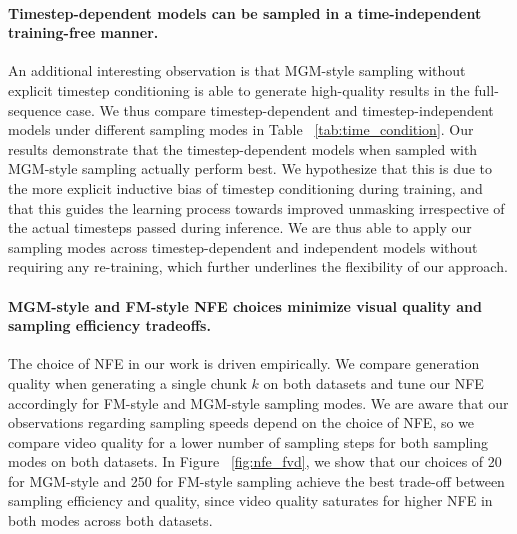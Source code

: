 \paragraph{Timestep-dependent models can be sampled in a time-independent training-free manner.}
An additional interesting observation is that MGM-style sampling without explicit timestep conditioning is able to generate high-quality results in the full-sequence case. We thus compare timestep-dependent and timestep-independent models under different sampling modes in Table ~\ref{tab:time_condition}. Our results demonstrate that the timestep-dependent models when sampled with MGM-style sampling actually perform best. We hypothesize that this is due to the more explicit inductive bias of timestep conditioning during training, and that this guides the learning process towards improved unmasking irrespective of the actual timesteps passed during inference. We are thus able to apply our sampling modes across timestep-dependent and independent models without requiring any re-training, which further underlines the flexibility of our approach.
\vspace{-10pt}

\paragraph{MGM-style and FM-style NFE choices minimize visual quality and sampling efficiency tradeoffs.}
The choice of NFE in our work is driven empirically. We compare generation quality when generating a single chunk $k$ on both datasets and tune our NFE accordingly for FM-style and MGM-style sampling modes. We are aware that our observations regarding sampling speeds depend on the choice of NFE, so we compare video quality for a lower number of sampling steps for both sampling modes on both datasets. In Figure ~\ref{fig:nfe_fvd}, we show that our choices of 20 for MGM-style and 250 for FM-style sampling achieve the best trade-off between sampling efficiency and quality, since video quality saturates for higher NFE in both modes across both datasets.

